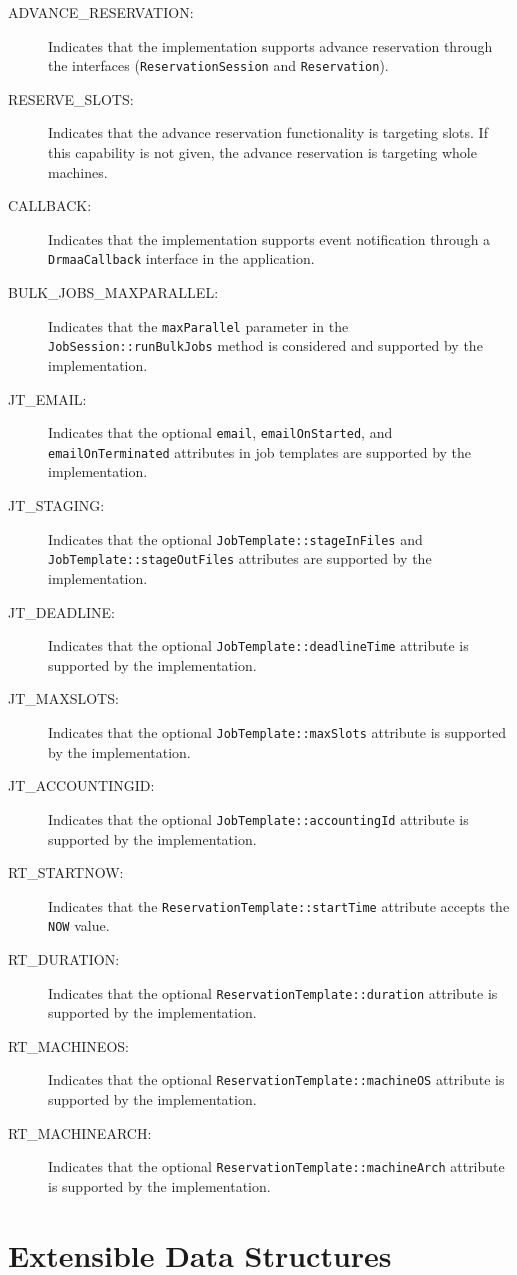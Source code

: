 \documentclass{article}
\newcommand{\h}[1]{\lstinline|#1|}
\begin{document}
\begin{description}
\item[ADVANCE\_RESERVATION:] Indicates that the implementation supports advance reservation through the interfaces (\h{ReservationSession} and \h{Reservation}).
\item[RESERVE\_SLOTS:] Indicates that the advance reservation functionality is targeting slots. If this capability is not given, the advance reservation is targeting whole machines.
\item[CALLBACK:] Indicates that the implementation supports event notification through a \h{DrmaaCallback} interface in the application.
\item[BULK\_JOBS\_MAXPARALLEL:] Indicates that the \h{maxParallel} parameter in the \h{JobSession::runBulkJobs} method is considered and supported by the implementation.
\item[JT\_EMAIL:] Indicates that the optional \h{email}, \h{emailOnStarted}, and \h{emailOnTerminated} attributes in job templates are supported by the implementation.
\item[JT\_STAGING:] Indicates that the optional \h{JobTemplate::stageInFiles} and \h{JobTemplate::stageOutFiles} attributes are supported by the implementation.
\item[ JT\_DEADLINE:] Indicates that the optional \h{JobTemplate::deadlineTime} attribute is supported by the implementation.
\item[ JT\_MAXSLOTS:] Indicates that the optional \h{JobTemplate::maxSlots} attribute is supported by the implementation.
\item[JT\_ACCOUNTINGID:] Indicates that the optional \h{JobTemplate::accountingId} attribute is supported by the implementation.
\item[RT\_STARTNOW:] Indicates that the \h{ReservationTemplate::startTime} attribute accepts the \h{NOW} value.
\item[RT\_DURATION:] Indicates that the optional \h{ReservationTemplate::duration} attribute is supported by the implementation.
\item[RT\_MACHINEOS:] Indicates that the optional \h{ReservationTemplate::machineOS} attribute is supported by the implementation.
\item[RT\_MACHINEARCH:] Indicates that the optional \h{ReservationTemplate::machineArch} attribute is supported by the implementation.
\end{description}

\section{Extensible Data Structures}
\label{sec:structextension}
\end{document}
